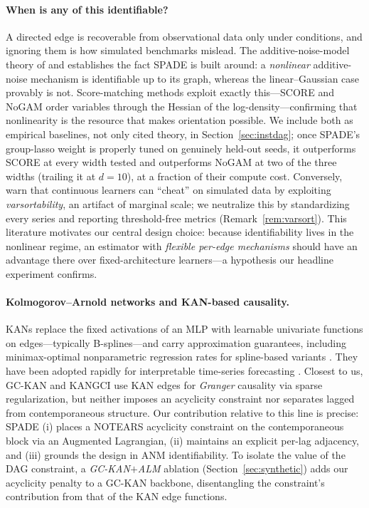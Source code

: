 \paragraph{When is any of this identifiable?} A directed edge is recoverable from
observational data only under conditions, and ignoring them is how simulated
benchmarks mislead. The additive-noise-model theory of \citet{hoyer2008nonlinear}
and \citet{peters2014causal} establishes the fact SPADE is built around: a
\emph{nonlinear} additive-noise mechanism is identifiable up to its graph, whereas
the linear--Gaussian case provably is not. Score-matching methods exploit exactly
this---SCORE \citep{rolland2022score} and NoGAM \citep{montagna2023nogam} order
variables through the Hessian of the log-density---confirming that nonlinearity is
the resource that makes orientation possible. We include both as empirical
baselines, not only cited theory, in Section~\ref{sec:instdag}; once SPADE's
group-lasso weight is properly tuned on genuinely held-out seeds, it
outperforms SCORE at every width tested and outperforms NoGAM at two of the
three widths (trailing it at $d{=}10$), at a fraction of their compute cost.
Conversely,
\citet{reisach2021beware,reisach2023scale} warn that continuous learners can
``cheat'' on simulated data by exploiting \emph{varsortability}, an artifact of
marginal scale; we neutralize this by standardizing every series and reporting
threshold-free metrics (Remark~\ref{rem:varsort}). This literature motivates our
central design choice: because identifiability lives in the nonlinear regime, an
estimator with \emph{flexible per-edge mechanisms} should have an advantage there
over fixed-architecture learners---a hypothesis our headline experiment confirms.

\paragraph{Kolmogorov--Arnold networks and KAN-based causality.} KANs
\citep{Liu2024,liu2024kan2} replace the fixed activations of an MLP with learnable
univariate functions on edges---typically B-splines---and carry approximation
guarantees, including minimax-optimal nonparametric regression rates for
spline-based variants \citep{liu2025kanconvergence}. They have been adopted
rapidly for interpretable time-series forecasting
\citep{xu2024kantimeseries,genet2024tkan,liang2025itfkan,vacarubio2025pkan}.
Closest to us, GC-KAN \citep{GCKAN2024} and KANGCI \citep{liu2025kangci} use KAN
edges for \emph{Granger} causality via sparse regularization, but neither imposes
an acyclicity constraint nor separates lagged from contemporaneous structure. Our
contribution relative to this line is precise: SPADE (i) places a NOTEARS
acyclicity constraint on the contemporaneous block via an Augmented Lagrangian,
(ii) maintains an explicit per-lag adjacency, and (iii) grounds the design in ANM
identifiability. To isolate the value of the DAG constraint, a
\emph{GC-KAN$+$ALM} ablation (Section~\ref{sec:synthetic}) adds our acyclicity
penalty to a GC-KAN backbone, disentangling the constraint's contribution from
that of the KAN edge functions.

